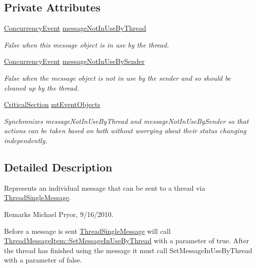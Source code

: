 \subsection*{Private Attributes}
\begin{DoxyCompactItemize}
\item 
\hyperlink{class_concurrency_event}{ConcurrencyEvent} \hyperlink{class_thread_message_item_a9cf19e411c1f07bd18849a9668d810b1}{messageNotInUseByThread}
\begin{DoxyCompactList}\small\item\em False when this message object is in use by the thread. \item\end{DoxyCompactList}\item 
\hyperlink{class_concurrency_event}{ConcurrencyEvent} \hyperlink{class_thread_message_item_a2a8ec880575ef64e499454fd94967d05}{messageNotInUseBySender}
\begin{DoxyCompactList}\small\item\em False when the message object is not in use by the sender and so should be cleaned up by the thread. \item\end{DoxyCompactList}\item 
\hyperlink{class_critical_section}{CriticalSection} \hyperlink{class_thread_message_item_a8904b4b9c74de4de6eee493b8dd92801}{mtEventObjects}
\begin{DoxyCompactList}\small\item\em Synchronizes messageNotInUseByThread and messageNotInUseBySender so that actions can be taken based on both without worrying about their status changing independently. \item\end{DoxyCompactList}\end{DoxyCompactItemize}


\subsection{Detailed Description}
Represents an individual message that can be sent to a thread via \hyperlink{class_thread_single_message}{ThreadSingleMessage}. \begin{DoxyRemark}{Remarks}
Michael Pryor, 9/16/2010.
\end{DoxyRemark}
Before a message is sent \hyperlink{class_thread_single_message}{ThreadSingleMessage} will call \hyperlink{class_thread_message_item_ad630f0afd5fe2d027415d04f35375f33}{ThreadMessageItem::SetMessageInUseByThread} with a parameter of true. After the thread has finished using the message it must call SetMessageInUseByThread with a parameter of false. 

